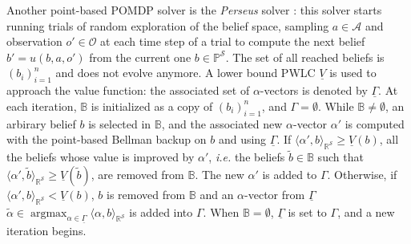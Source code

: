 Another point-based POMDP solver is the \textit{Perseus} solver \cite{Spaan04techrep}:
this solver starts running trials of random exploration of the belief space,
sampling $a \in \mathcal{A}$ and observation $o' \in \mathcal{O}$ at each time step of a trial 
to compute the next belief $b'=u(b,a,o')$ from the current one $b \in \mathbb{P}^{\mathcal{S}}$.
The set of all reached beliefs is $(b_i)_{i=1}^{n}$ and does not evolve anymore. 
A lower bound PWLC $\underline{V}$ is used to approach the value function:
the associated set of $\alpha$-vectors is denoted by $\underline{\Gamma}$.
At each iteration, $\mathbb{B}$ is initialized as a copy of $(b_i)_{i=1}^{n}$,
and $\Gamma = \emptyset$. 
While $\mathbb{B} \neq \emptyset$, an arbirary belief $b$ is selected in $\mathbb{B}$,
and the associated new $\alpha$-vector $\alpha'$ is computed with the point-based Bellman backup on $b$ 
and using $\underline{\Gamma}$.
If $\langle \alpha', b \rangle_{\mathbb{R}^{\mathcal{S}}} \geqslant \underline{V}(b)$,
all the beliefs whose value is improved by $\alpha'$,
\textit{i.e.} the beliefs $\tilde{b} \in \mathbb{B}$ such that
$\langle \alpha', \tilde{b} \rangle_{\mathbb{R}^{\mathcal{S}}} \geqslant \underline{V}(\tilde{b}) $, are removed from $\mathbb{B}$.
The new $\alpha'$ is added to $\Gamma$.
Otherwise, if $\langle \alpha', b \rangle_{\mathbb{R}^{\mathcal{S}}} < \underline{V}(b)$,
$b$ is removed from $\mathbb{B}$ and an $\alpha$-vector from 
$\underline{\Gamma}$ $\tilde{\alpha} \in \operatorname*{argmax}_{\alpha \in \underline{\Gamma}} \langle \alpha, b \rangle_{\mathbb{R}^{\mathcal{S}}}$ 
is added into $\Gamma$. When $\mathbb{B} = \emptyset$, $\underline{\Gamma}$ is set to $\Gamma$,
and a new iteration begins.

